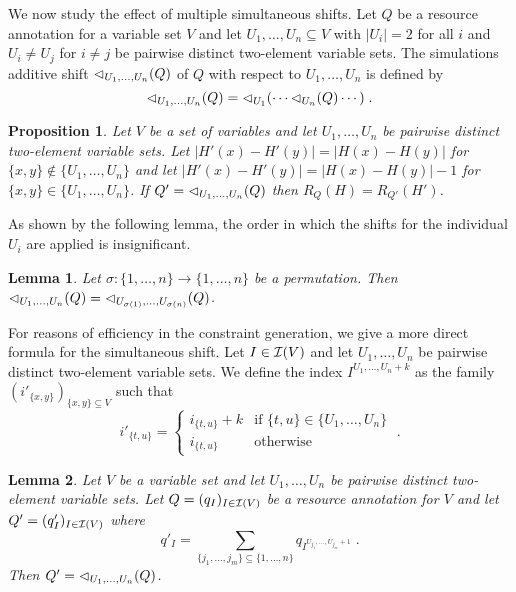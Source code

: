 \documentclass[10pt]{article}
\newtheorem{lemma}{Lemma}
\newtheorem{proposition}{Proposition}
\begin{document}
We now study the effect of multiple simultaneous shifts.  Let $Q$ be a
resource annotation for a variable set $V$ and let $U_1,\ldots,U_n
\subseteq V$ with $|U_i| = 2$ for all $i$ and $U_i \neq U_j$ for $i
\neq j$ be pairwise distinct two-element variable sets.  The
simulations additive shift ${\lhd}_{U_1,\ldots,U_n}(Q)$ of $Q$ with
respect to $U_1,\ldots,U_n$ is defined by
$$
{\lhd}_{U_1,\ldots,U_n}(Q) = {\lhd}_{U_1}( \cdots {\lhd}_{U_n}(Q) \cdots ) \; .
$$
%
\begin{proposition}
  Let $V$ be a set of variables and let $U_1,\ldots,U_n$ be pairwise
  distinct two-element variable sets.  Let $|H'(x) {-} H'(y)| = |H(x)
  {-} H(y)|$ for $\{x,y\} \not\in \{U_1,\ldots,U_n\}$ and let $|H'(x)
  {-} H'(y)| = |H(x) {-} H(y)| - 1$ for $\{x,y\} \in
  \{U_1,\ldots,U_n\}$.
  If $Q' = {\lhd}_{U_1,\ldots,U_n}(Q)$ then $R_Q(H) = R_{Q'}(H')$.
\end{proposition}
%
As shown by the following lemma, the order in which the shifts for the
individual $U_i$ are applied is insignificant.
%
\begin{lemma}
  Let $\sigma : \{1,\ldots,n\} \to \{1,\ldots,n\}$ be a
  permutation. Then ${\lhd}_{U_1,\ldots,U_n}(Q) =
  {\lhd}_{U_{\sigma(1)},\ldots,U_{\sigma(n)}}(Q)$.
\end{lemma}
%
For reasons of efficiency in the constraint generation, we give a more
direct formula for the simultaneous shift.  Let $I \in \mathcal{I}(V)$ and
let $U_1,\ldots,U_n$ be pairwise distinct two-element variable sets.
We define the index $I^{U_1,\ldots,U_n + k}$ as the family $(i'_{\{x,y\}})_{\{x,y\} \subseteq V}$ such that
$$
i'_{\{t,u\}} = \left\{
  \begin{array}{ll}
    i_{\{t,u\}} + k  & \text{if } \{t,u\} \in \{U_1,\ldots,U_n\} \\
    i_{\{t,u\}} & \text{otherwise}
  \end{array}
\right.  \;.
$$

%
\begin{lemma}
  Let $V$ be a variable set and let $U_1,\ldots,U_n$ be pairwise
  distinct two-element variable sets.
  Let $Q = (q_I)_{I \in \mathcal{I}(V)}$ be a resource annotation for
  $V$ and let $ Q' = (q'_I)_{I \in \mathcal{I}(V)}$ where
  $$
  q'_I = \sum_{\{j_1,\ldots,j_m\} \subseteq \{1,\ldots,n\} } q_{I^{U_{j_1},\ldots,U_{j_m}+1}} \; .
  $$
  Then $Q' = {\lhd}_{U_1,\ldots,U_n}(Q)$.
\end{lemma}










\end{document}
